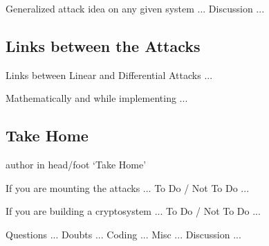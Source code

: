 \documentclass[9pt]{beamer}
\begin{document}
\begin{frame}
Generalized attack idea on any given system ... Discussion ...

\end{frame}

\subsection{Links between the Attacks}
\begin{frame}
Links between Linear and Differential Attacks ...

\end{frame}

\begin{frame}
Mathematically and while implementing ...

\end{frame}

\subsection{Take Home}
\begin{frame}
\begin{beamercolorbox}[ht=2.5ex,dp=1.125ex,center,rounded=true,shadow=true]{author in head/foot}
`Take Home'
\end{beamercolorbox}
\end{frame}

\begin{frame}
If you are mounting the attacks ... To Do / Not To Do ...

\end{frame}

\begin{frame}
If you are building a cryptosystem ... To Do / Not To Do ...

\end{frame}

\begin{frame}
Questions ... Doubts ... Coding ... Misc ... Discussion ...

\end{frame}
\end{document}
